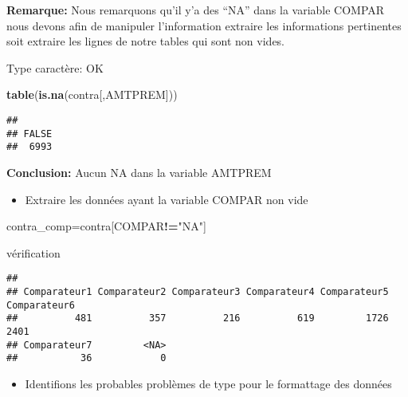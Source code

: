 \documentclass[
]{article}
\newenvironment{Shaded}{\begin{snugshade}}{\end{snugshade}}
\newcommand{\DataTypeTok}[1]{\textcolor[rgb]{0.13,0.29,0.53}{#1}}
\newcommand{\KeywordTok}[1]{\textcolor[rgb]{0.13,0.29,0.53}{\textbf{#1}}}
\newcommand{\NormalTok}[1]{#1}
\newcommand{\OperatorTok}[1]{\textcolor[rgb]{0.81,0.36,0.00}{\textbf{#1}}}
\newcommand{\StringTok}[1]{\textcolor[rgb]{0.31,0.60,0.02}{#1}}
\providecommand{\tightlist}{%
  \setlength{\itemsep}{0pt}\setlength{\parskip}{0pt}}
\begin{document}
\textbf{Remarque:} Nous remarquons qu'il y'a des ``NA'' dans la variable
COMPAR nous devons afin de manipuler l'information extraire les
informations pertinentes soit extraire les lignes de notre tables qui
sont non vides.

Type caractère: OK

\begin{Shaded}
\begin{Highlighting}[]
\KeywordTok{table}\NormalTok{(}\KeywordTok{is.na}\NormalTok{(contra[,AMTPREM]))}
\end{Highlighting}
\end{Shaded}

\begin{verbatim}
## 
## FALSE 
##  6993
\end{verbatim}

\textbf{Conclusion:} Aucun NA dans la variable AMTPREM

\begin{itemize}
\tightlist
\item
  Extraire les données ayant la variable COMPAR non vide
\end{itemize}

\begin{Shaded}
\begin{Highlighting}[]
\NormalTok{contra_comp=contra[COMPAR}\OperatorTok{!=}\StringTok{"NA"}\NormalTok{]}
\end{Highlighting}
\end{Shaded}

vérification

\begin{Shaded}
\end{Shaded}

\begin{verbatim}
## 
## Comparateur1 Comparateur2 Comparateur3 Comparateur4 Comparateur5 Comparateur6 
##          481          357          216          619         1726         2401 
## Comparateur7         <NA> 
##           36            0
\end{verbatim}

\begin{itemize}
\tightlist
\item
  Identifions les probables problèmes de type pour le formattage des
  données
\end{itemize}
\end{document}
